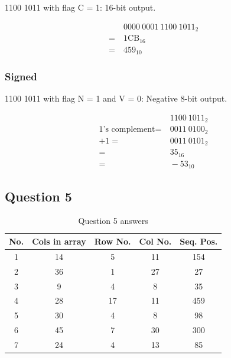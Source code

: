 \documentclass[12pt,a4paper]{article}
\begin{document}
1100 1011 with flag C = 1: 16-bit output.

\begin{align*}
&\ 0000\ 0001\ 1100\ 1011_{2} \\
=&\ 1\text{CB}_{16} \\
=&\ 459_{10}
\end{align*}

\newpage
\subsubsection{Signed}

1100 1011 with flag N = 1 and V = 0: Negative 8-bit output.

\begin{align*}
&\ 1100\ 1011_{2} \\
\text{1's complement} =&\ 0011\ 0100_{2} \\
+ 1 =&\ 0011\ 0101_{2} \\
=&\ 35_{16} \\
=&\ -53_{10}
\end{align*}

\subsection{Question 5}

\begin{table}[!h]
\centering
\caption{Question 5 answers}
\begin{tabular}{c|c|c|c|c}
No. & Cols in array & Row No. & Col No. & Seq. Pos. \\
\hline
1 & 14 &  5 & 11 & 154 \\ \hline
2 & 36 &  1 & 27 &  27 \\ \hline
3 &  9 &  4 &  8 &  35 \\ \hline
4 & 28 & 17 & 11 & 459 \\ \hline
5 & 30 &  4 &  8 &  98 \\ \hline
6 & 45 &  7 & 30 & 300 \\ \hline
7 & 24 &  4 & 13 &  85 \\ \hline
\end{tabular}
\end{table}
\end{document}
